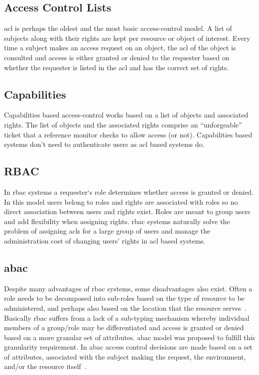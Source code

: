 \subsection{Access Control Lists}

\ac{acl} is perhaps the oldest and the most basic access-control model. A list of subjects along with their rights are kept per resource or object of interest. Every time a subject makes an access request on an object, the \ac{acl} of the object is consulted and access is either granted or denied to the requester based on whether the requester is listed in the \ac{acl} and has the correct set of rights.

\subsection{Capabilities}
Capabilities based access-control works based on a list of objects and associated rights. The list of objects and the associated rights comprise an ``unforgeable'' ticket that a reference monitor checks to allow access (or not). Capabilities based systems don't need to authenticate users as \ac{acl} based systems do.

\subsection{RBAC}

In \ac*{rbac} systems a requester`s role determines whether access is granted or denied. In this model users belong to roles and rights are associated with roles so no direct association between users and rights exist. Roles are meant to group users and add flexibility when assigning rights. \ac{rbac} systems naturally solve the problem of assigning \ac{acl}s for a large group of users and manage the administration cost of changing users' rights in \ac{acl} based systems.

\subsection{\ac{abac}}

Despite many advantages of \ac{rbac} systems, some disadvantages also exist. Often a role needs to be decomposed into sub-roles based on the type of resource to be administered, and perhaps also based on the location that the resource serves~\cite{nist}. Basically \ac{rbac} suffers from a lack of a sub-typing mechanism whereby individual members of a group/role may be differentiated and access is granted or denied based on a more granular set of attributes. \ac{abac} model was proposed to fulfill this granularity requirement. In \ac{abac} access control decisions are made based on a set of attributes, associated with the subject making the request, the environment, and/or the resource itself~\cite{nist}. 

